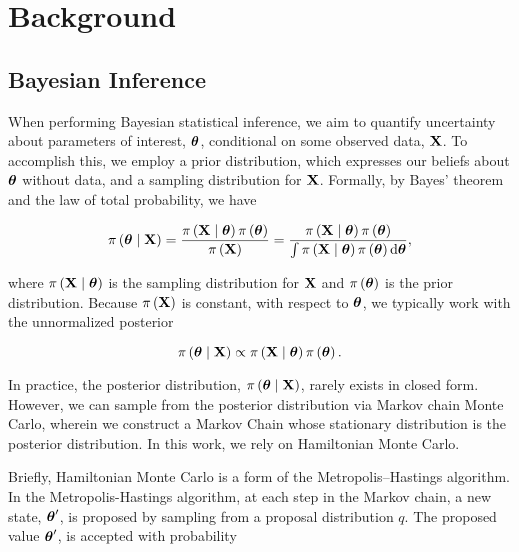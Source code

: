 \chapter{Background}
\label{ch:background}
\section{Bayesian Inference}
\label{ch_2:sec:bayesian-mcmc}

When performing Bayesian statistical inference, we aim to quantify uncertainty about parameters of interest, \( \boldsymbol{\theta} \), conditional on some observed data, \( \mathbf{X} \).
To accomplish this, we employ a prior distribution, which expresses our beliefs about \( \boldsymbol{\theta} \) without data, and a sampling distribution for \( \mathbf{X} \).
Formally, by Bayes' theorem and the law of total probability, we have 

\begin{equation}
    \pi \left( \boldsymbol{\theta} \mid \mathbf{X} \right) = \frac{\pi \left( \mathbf{X} \mid \boldsymbol{\theta} \right) \pi \left( \boldsymbol{\theta} \right)}{\pi \left(  \mathbf{X} \right)} = \frac{\pi \left( \mathbf{X} \mid \boldsymbol{\theta} \right) \pi \left( \boldsymbol{\theta} \right)}{\int \pi \left( \mathbf{X} \mid \boldsymbol{\theta} \right) \pi \left( \boldsymbol{\theta} \right) \mathrm{d} \boldsymbol{\theta}},
\end{equation}

where \( \pi \left( \mathbf{X} \mid \boldsymbol{\theta} \right) \) is the sampling distribution for \( \mathbf{X} \) and \( \pi \left( \boldsymbol{\theta} \right) \) is the prior distribution.
Because \( \pi \left( \mathbf{X} \right) \) is constant, with respect to \( \boldsymbol{\theta} \), we typically work with the unnormalized posterior

\begin{equation}
    \pi \left( \boldsymbol{\theta} \mid \mathbf{X} \right) \propto \pi \left( \mathbf{X} \mid \boldsymbol{\theta} \right) \pi \left( \boldsymbol{\theta} \right).
\end{equation}

In practice, the posterior distribution, \( \pi \left( \boldsymbol{\theta} \mid \mathbf{X} \right) \), rarely exists in closed form.
However, we can sample from the posterior distribution via Markov chain Monte Carlo, wherein we construct a Markov Chain whose stationary distribution is the posterior distribution.
In this work, we rely on Hamiltonian Monte Carlo.

Briefly, Hamiltonian Monte Carlo is a form of the Metropolis–Hastings algorithm.
In the Metropolis-Hastings algorithm, at each step in the Markov chain, a new state, \( \boldsymbol{\theta}^\prime \), is proposed by sampling from a proposal distribution \( q \).
The proposed value \( \boldsymbol{\theta}^\prime \), is accepted with probability 

